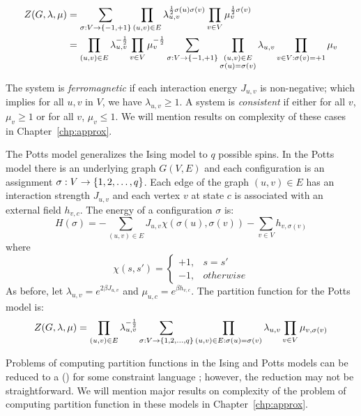 \begin{align*}
Z(G,\lambda,\mu)&=\sum_{\sigma :V\to\{{-1,+1}\}} \prod_{(u,v)\in E} \lambda_{u,v}^{\frac{1}{2}
\sigma(u)\sigma(v)}\prod_{v\in V}\mu_v^{\frac{1}{2}\sigma(v)}\\
&=\prod_{(u,v)\in E}\lambda_{u,v}^{-\frac{1}{2}}\prod_{v\in V}\mu_v^{-\frac{1}{2}}\sum_{\sigma:V\to
\{{-1,+1}\}}
\prod_{\substack{(u,v)\in E \\ \sigma(u)=\sigma(v)}}\lambda_{u,v}\prod_{v\in V:
\sigma(v)=+1}\mu_v
\end{align*}

The system is \emph{ferromagnetic} if each interaction energy \(J_{u,v}\) is non-negative; 
which implies for all \(u,v\) in \(V\), we have \(\lambda_{u,v} \ge 1\)\@.
A system is \emph{consistent} if
either for all \(v\), \(\mu_v\ge 1\) or for all \(v\), \(\mu_v \le 1\)\@. We will
mention results on complexity of these cases in Chapter~\ref{chp:approx}\@.

The Potts model generalizes the Ising model to \(q\) possible spins.
In the Potts model there is an underlying graph \(G(V,E)\) and 
each configuration is an assignment \(\sigma:V\to \{{{1,2,\dotsc,q}}\}\)\@.
Each edge of the graph \((u,v)\in E\) has an interaction
strength \(J_{u,v}\) and each vertex \(v\) at state \(c\) is associated with an
external field \(h_{v,c}\)\@. The energy of a configuration $\sigma$ is:
\[H(\sigma)=-\sum_{(u,v)\in E} J_{u,v}\chi(\sigma(u),\sigma(v)) - \sum_{v\in V} 
h_{v,\sigma(v)}\]
where
\[\chi(s,s')=\begin{cases}+1, & s=s'\\-1, & otherwise\end{cases}\]
As before, let \(\lambda_{u,v}=e^{2\beta J_{u,v}}\) and
\(\mu_{u,c}=e^{\beta h_{v,c}}\)\@. The partition function for the Potts model is:
\[Z(G,\lambda,\mu)=\prod_{(u,v)\in E}\lambda_{u,v}^{-\frac{1}{2}}
\sum_{\sigma:V\to\{{{1,2,\dotsc,q}}\}} \prod_{(u,v)\in E:\sigma(u)=\sigma(v)}\lambda_{u,v}
\prod_{v\in V}\mu_{v,\sigma(v)}\]

Problems of computing partition functions in the Ising and Potts models can be
reduced to a \ccsp(\mrelset) for some constraint language \mrelset; however, the reduction
may not be straightforward. We will mention major results on complexity of the problem of computing 
partition function in these models in Chapter~\ref{chp:approx}\@.

